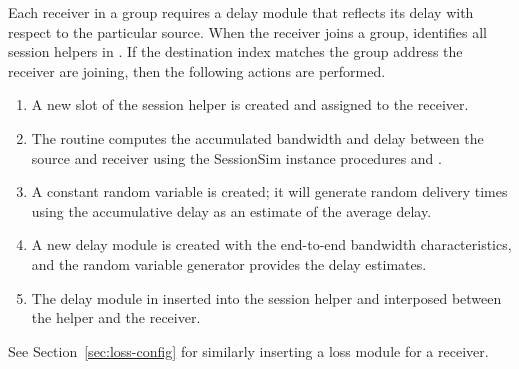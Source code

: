 Each receiver in a group requires a delay module that
reflects its delay with respect to the particular source.
When the receiver joins a group, 
 identifies all session helpers in .
If the destination index matches the group address
the receiver are joining, then the following actions are performed.
\begin{enumerate}
\item A new slot of the session helper is created and assigned to the receiver.
\item The routine computes the accumulated bandwidth and delay
  between the source and receiver using the SessionSim instance procedures
   and .
\item A constant random variable is created; it will generate random delivery
  times using the accumulative delay as an estimate of the average delay.
\item A new delay module is created with the end-to-end bandwidth
  characteristics, and the random variable generator provides the delay
  estimates.
\item The delay module in inserted into the session helper and interposed
  between the helper and the receiver.
\end{enumerate}
See Section~\ref{sec:loss-config} for similarly
inserting a loss module for a receiver.



